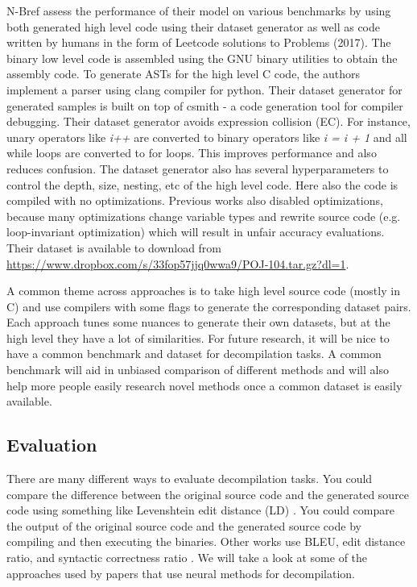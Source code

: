\documentclass{article}
\begin{document}
N-Bref \cite{nbref} assess the performance of their model on various benchmarks by using both generated high level code using their dataset generator as well as code written by humans in the form of Leetcode solutions to Problems (2017). The binary low level code is assembled using the GNU binary utilities to obtain the assembly code. To generate ASTs for the high level C code, the authors implement a parser using clang compiler for python. Their dataset generator for generated samples is built on top of csmith \cite{yang2011finding} - a code generation tool for compiler debugging. Their dataset generator avoids expression collision (EC). For instance, unary operators like \textit{i++} are converted to binary operators like \textit{i = i + 1} and all while loops are converted to for loops. This improves performance and also reduces confusion. The dataset generator also has several hyperparameters to control the depth, size, nesting, etc of the high level code. Here also the code is compiled with no optimizations. Previous works \cite{brumley2013native,lee2011tie,lin2010automatic} also
disabled optimizations, because many optimizations change variable types and rewrite source code
(e.g. loop-invariant optimization) which will result in unfair accuracy evaluations. Their dataset is available to download from \url{https://www.dropbox.com/s/33fop57jjq0wwa9/POJ-104.tar.gz?dl=1}.

A common theme across approaches is to take high level source code (mostly in C) and use compilers with some flags to generate the corresponding dataset pairs. Each approach tunes some nuances to generate their own datasets, but at the high level they have a lot of similarities. For future research, it will be nice to have a common benchmark and dataset for decompilation tasks. A common benchmark will aid in unbiased comparison of different methods and will also help more people easily research novel methods once a common dataset is easily available.

\subsection{Evaluation}
There are many different ways to evaluate decompilation tasks. You could compare the difference between the original source code and the generated source code using something like Levenshtein edit distance (LD) \cite{hyyro2001explaining}. You could compare the output of the original source code and the generated source code by compiling and then executing the binaries. Other works use BLEU, edit distance ratio, and syntactic correctness ratio \cite{nguyen2013lexical}. We will take a look at some of the approaches used by papers that use neural methods for decompilation.
\end{document}
